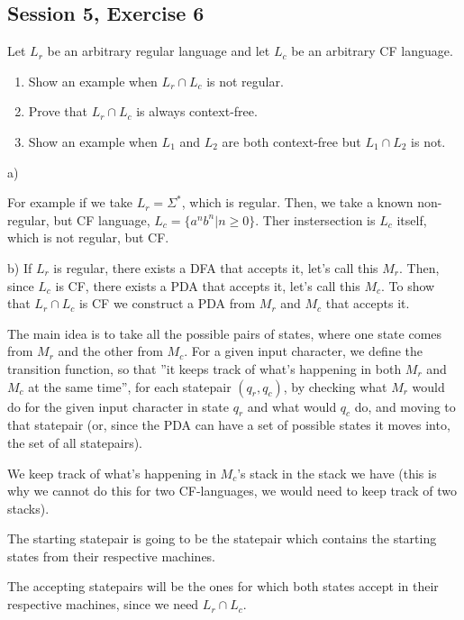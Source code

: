 \subsection {Session 5, Exercise 6}


Let $L_r$ be an arbitrary regular language and let $L_c$ be an arbitrary CF language.
\begin{enumerate}
    \item Show an example when $L_r \cap L_c$ is not regular.
    \item Prove that $L_r \cap L_c$ is always context-free.
    \item Show an example when $L_1$ and $L_2$ are both context-free but $L_1 \cap L_2$ is not.
\end{enumerate}


a)

For example if we take $L_r = \Sigma^*$, which is regular. Then, we take a known non-regular, but CF language, $L_c = \{a^nb^n | n \geq{} 0\}$. Ther instersection is $L_c$ itself, which is not regular, but CF.

b) If $L_r$ is regular, there exists a DFA that accepts it, let's call this $M_r$. Then, since $L_c$ is CF, there exists a PDA that accepts it, let's call this $M_c$. To show that $L_r \cap L_c$ is CF we construct a PDA from $M_r$ and $M_c$ that accepts it.

The main idea is to take all the possible pairs of states, where one state comes from $M_r$ and the other from $M_c$. For a given input character, we define the transition function, so that ''it keeps track of what's happening in both $M_r$ and $M_c$ at the same time'', for each statepair $(q_r, q_c)$, by checking what $M_r$ would do for the given input character in state $q_r$ and what would $q_c$ do, and moving to that statepair (or, since the PDA can have a set of possible states it moves into, the set of all statepairs).

We keep track of what's happening in $M_c$'s stack in the stack we have (this is why we cannot do this for two CF-languages, we would need to keep track of two stacks).

The starting statepair is going to be the statepair which contains the starting states from their respective machines.

The accepting statepairs will be the ones for which both states accept in their respective machines, since we need $L_r \cap L_c$.

